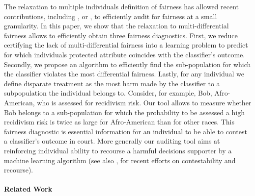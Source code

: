 \documentclass{article}
\begin{document}
 \bigskip
 The relaxation to multiple individuals definition of fairness has allowed recent contributions, including \cite{kim2018fairness}, \cite{hebert2017calibration} or \cite{kearns2017preventing}, to efficiently audit for fairness at a small granularity. In this paper,  we show that the relaxation to multi-differential fairness allows to efficiently obtain three fairness diagnostics.  First, we reduce certifying the lack of multi-differential fairness into a learning problem to predict for which individuals protected attribute coincides with the classifier's outcome. Secondly, we propose an algorithm to efficiently find the sub-population for which the classifier violates the most differential fairness. Lastly, for any individual we define disparate treatment as the most harm made by the classifier to a subpopulation the individual belongs to. Consider, for example, Bob, Afro-American, who is assessed for recidivism risk. Our tool allows to measure whether Bob belongs to a sub-population for which the probability to be assessed a high recidivism risk is twice as large for Afro-American than for other races. This fairness diagnostic is essential information for an individual to be able to contest a classifier's outcome in court. More generally our auditing tool aims at reinforcing individual ability to recourse a harmful decisions supporter by a machine learning algorithm (see also \cite{ustun2018actionable}, \cite{russell2019efficient} for recent efforts on contestability and recourse).  
 
 \paragraph{Related Work}
 
 
\end{document}
